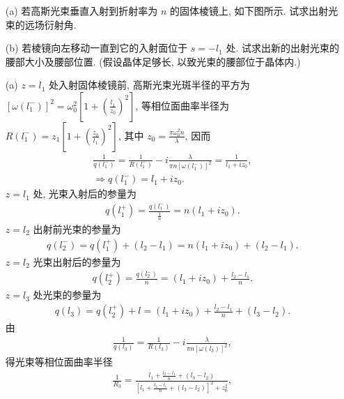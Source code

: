 \documentclass[twoside]{note}
\begin{document}
\begin{exe}
    \begin{itemize}
        \item[(a)] 若高斯光束垂直入射到折射率为 $n$ 的固体棱镜上, 如下图所示.
        试求出射光束的远场衍射角.
        \item[(b)] 若棱镜向左移动一直到它的入射面位于 $s=-l_1$ 处. 试求出新的出射光束的腰部大小及腰部位置. (假设晶体足够长, 以致光束的腰部位于晶体内.)
    \end{itemize}
\end{exe}
\begin{sol}
    \begin{itemize}
        \item[(a)] $z=l_1$ 处入射固体棱镜前, 高斯光束光斑半径的平方为 $[\omega(l_1^-)]^2=\omega_0^2\left[1+\left(\frac{l_1}{z_0}\right)^2\right]$, 等相位面曲率半径为 $R(l_1^-)=z_1\left[1+\left(\frac{z_0}{l_1}\right)^2\right]$, 其中 $z_0=\frac{\pi\omega_0^2n}{\lambda}$, 因而
        \begin{gather}
            \frac{1}{q(l_1^-)}=\frac{1}{R(l_1^-)}-i\frac{\lambda}{\pi n[\omega(l_1^-)]^2}=\frac{1}{l_1+iz_0},\\
            \Longrightarrow q(l_1^-)=l_1+iz_0.
        \end{gather}
        $z=l_1$ 处, 光束入射后的参量为
        \begin{align}
            q(l_1^+)=\frac{q(l_1^-)}{\frac{1}{n}}=n(l_1+iz_0).
        \end{align}
        $z=l_2$ 出射前光束的参量为
        \begin{align}
            q(l_2^-)=q(l_1^+)+(l_2-l_1)=n(l_1+iz_0)+(l_2-l_1).
        \end{align}
        $z=l_2$ 光束出射后的参量为
        \begin{align}
            q(l_2^+)=\frac{q(l_2^-)}{n}=(l_1+iz_0)+\frac{l_2-l_1}{n}.
        \end{align}
        $z=l_3$ 处光束的参量为
        \begin{align}
            q(l_3)=q(l_2^+)+l=(l_1+iz_0)+\frac{l_2-l_1}{n}+(l_3-l_2).
        \end{align}
        由
        \begin{align}
            \frac{1}{q(l_3)}=\frac{1}{R(l_3)}-i\frac{\lambda}{\pi n[\omega(l_3)]^2},
        \end{align}
        得光束等相位面曲率半径
        \begin{align}
            \frac{1}{R_3}=\frac{l_1+\frac{l_2-l_1}{n}+(l_3-l_2)}{\left[l_1+\frac{l_2-l_1}{n}+(l_3-l_2)\right]^2+z_0^2},

\end{align}
\end{itemize}
\end{sol}
\end{document}
